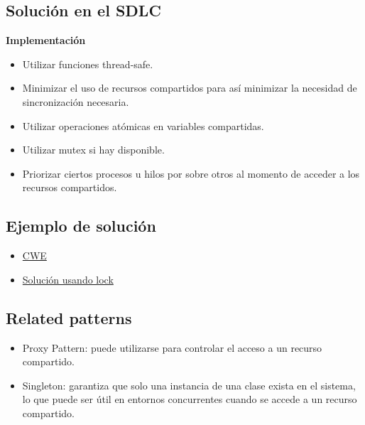 \subsection{Solución en el SDLC}

\textbf{Implementación} 

\begin{itemize}
    \item Utilizar funciones thread-safe.
    \item Minimizar el uso de recursos compartidos para así minimizar la necesidad de sincronización necesaria.
    \item Utilizar operaciones atómicas en variables compartidas.
    \item Utilizar mutex si hay disponible.
    \item Priorizar ciertos procesos u hilos por sobre otros al momento de acceder a los recursos compartidos.
\end{itemize}

\subsection{Ejemplo de solución}

\begin{itemize}
    \item \href{https://cwe.mitre.org/data/definitions/362.html}{CWE}
    \item \href{https://plugins.trac.wordpress.org/changeset?sfp_email=&sfph_mail=&reponame=&new=2794107%40wp-polls%2Ftrunk&old=2729999%40wp-polls%2Ftrunk&sfp_email=&sfph_mail=}{Solución usando lock}
\end{itemize}

\subsection{Related patterns}

\begin{itemize}
    \item Proxy Pattern: puede utilizarse para controlar el acceso a un recurso compartido.
    \item Singleton: garantiza que solo una instancia de una clase exista en el sistema, lo que puede ser útil en entornos concurrentes cuando se accede a un recurso compartido.
\end{itemize}
